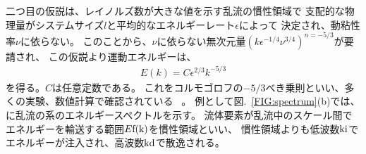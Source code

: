\documentclass[12pt,a4paper]{jbook}
\begin{document}
        二つ目の仮説は、レイノルズ数が大きな値を示す乱流の慣性領域で
        支配的な物理量がシステムサイズ$l$と平均的なエネルギーレート$\epsilon$によって
        決定され、動粘性率$\nu$に依らない。
        このことから、$\nu$に依らない無次元量$(k \epsilon^{-1/4} \nu^{3/4})^{n=-5/3}$が要請され、
        この仮説より運動エネルギーは、
        \begin{eqnarray}
            E(k) = C \epsilon^{2/3} k^{-5/3}
        \end{eqnarray}
        を得る。$C$は任意定数である。
        これをコルモゴロフの$-5/3$べき乗則といい、多くの実験、数値計算で確認されている
		~\cite{Frisch1, Kolmogorov, Batchelor, Tatsumi1, Tatsumi2, Kraichnan, Frisch2, Cyril, Goto1, Goto2}。
        例として図.~\ref{FIG:spectrum}(b)では、に乱流の系のエネルギースペクトルを示す。
        流体要素が乱流中のスケール間でエネルギーを輸送する範囲$E\rm{f}(k)$を慣性領域といい、
        慣性領域よりも低波数$\rm{ki}$でエネルギーが注入され、高波数$\rm{kd}$で散逸される。
\end{document}
